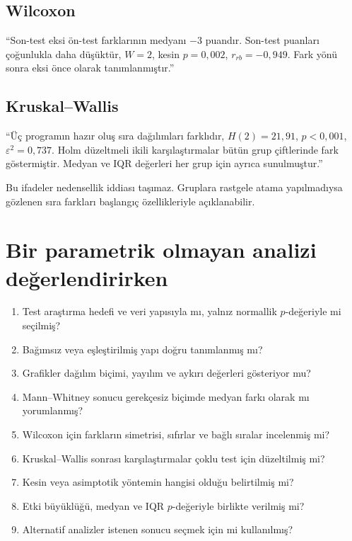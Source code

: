\subsection*{Wilcoxon}

``Son-test eksi ön-test farklarının medyanı $-3$ puandır. Son-test puanları
çoğunlukla daha düşüktür, $W=2$, kesin $p=0{,}002$,
$r_{rb}=-0{,}949$. Fark yönü sonra eksi önce olarak tanımlanmıştır.''

\subsection*{Kruskal--Wallis}

``Üç programın hazır oluş sıra dağılımları farklıdır,
$H(2)=21{,}91$, $p<0{,}001$, $\varepsilon^2=0{,}737$. Holm düzeltmeli ikili
karşılaştırmalar bütün grup çiftlerinde fark göstermiştir. Medyan ve IQR
değerleri her grup için ayrıca sunulmuştur.''

Bu ifadeler nedensellik iddiası taşımaz. Gruplara rastgele atama yapılmadıysa
gözlenen sıra farkları başlangıç özellikleriyle açıklanabilir.

\section{Bir parametrik olmayan analizi değerlendirirken}

\begin{enumerate}
  \item Test araştırma hedefi ve veri yapısıyla mı, yalnız normallik $p$-değeriyle mi seçilmiş?
  \item Bağımsız veya eşleştirilmiş yapı doğru tanımlanmış mı?
  \item Grafikler dağılım biçimi, yayılım ve aykırı değerleri gösteriyor mu?
  \item Mann--Whitney sonucu gerekçesiz biçimde medyan farkı olarak mı yorumlanmış?
  \item Wilcoxon için farkların simetrisi, sıfırlar ve bağlı sıralar incelenmiş mi?
  \item Kruskal--Wallis sonrası karşılaştırmalar çoklu test için düzeltilmiş mi?
  \item Kesin veya asimptotik yöntemin hangisi olduğu belirtilmiş mi?
  \item Etki büyüklüğü, medyan ve IQR $p$-değeriyle birlikte verilmiş mi?
  \item Alternatif analizler istenen sonucu seçmek için mi kullanılmış?
\end{enumerate}

